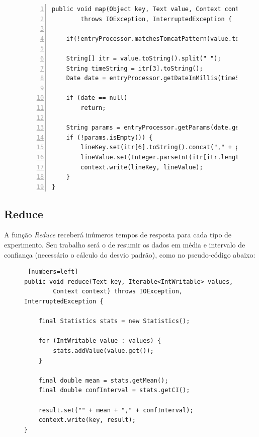 \documentclass[brazil, a4paper,12pt]{article}
\begin{document}
\begin{figure} [!htb]
\begin{center}
\footnotesize
\begin{lstlisting}[numbers=left]
public void map(Object key, Text value, Context context)
		throws IOException, InterruptedException {

	if(!entryProcessor.matchesTomcatPattern(value.toString())) return;

	String[] itr = value.toString().split(" ");
	String timeString = itr[3].toString();
	Date date = entryProcessor.getDateInMillis(timeString.substring(1));

	if (date == null)
		return;

	String params = entryProcessor.getParams(date.getTime());
	if (!params.isEmpty()) {
		lineKey.set(itr[6].toString().concat("," + params));
		lineValue.set(Integer.parseInt(itr[itr.length - 1].toString()));
		context.write(lineKey, lineValue);
	}
}
\end{lstlisting}
\end{center}
\end{figure}


\subsection{Reduce}
A função \emph{Reduce} receberá inúmeros tempos de resposta para cada tipo de experimento. Seu trabalho será o de resumir os dados em média e intervalo de confiança (necessário o cálculo do desvio padrão), como no pseudo-código abaixo:

\begin{figure} [!htb]
\begin{center}
\footnotesize
\begin{lstlisting} [numbers=left]
public void reduce(Text key, Iterable<IntWritable> values,
		Context context) throws IOException, InterruptedException {

	final Statistics stats = new Statistics();

	for (IntWritable value : values) {
		stats.addValue(value.get());
	}

	final double mean = stats.getMean();
	final double confInterval = stats.getCI();

	result.set("" + mean + "," + confInterval);
	context.write(key, result);
}
\end{lstlisting}
\end{center}
\end{figure}
\end{document}
